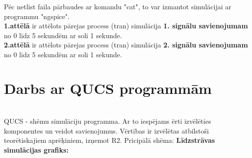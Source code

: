 \documentclass {report}
\begin{document}
\indent Pēc netlist faila pārbaudes ar komandu "cat", to var izmantot simulācijai ar programmu "ngspice". \\
\indent \textbf{1.attēlā} ir attēlots pārejas process (tran) simulācija \textbf{1. signālu savienojumam} no 0 līdz 5 sekundēm ar soli 1 sekunde. \\
\indent \textbf{2.attēlā} ir attēlots pārejas process (tran) simulācija \textbf{2. signālu savienojumam} no 0 līdz 5 sekundēm ar soli 1 sekunde.

\section{Darbs ar QUCS programmām}
\\ QUCS - shēmu simulāciju programma. Ar to iespējams ērti izvēlēties komponentes un veidot savienojumus. Vērtības ir izvēlētas atbilstoši teorētiskajiem aprēķiniem, izņemot R2.
Pricipālā shēma:
\textbf{Līdzstrāvas simulācijas grafiks:}
\end{document}
